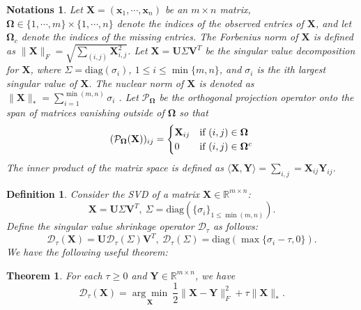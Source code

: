 \documentclass[fontset=windows]{article}
\newtheorem{definition}{Definition}[section]
\newtheorem{theorem}{Theorem}[section]
\newtheorem{notations}{Notations}
\begin{document}
{\begin{notations}
    Let $\mathbf X = (\mathbf x_1,\cdots,\mathbf x_n)$ be an $m \times n$ matrix, $\mathbf \Omega \in \{1,\cdots,m\}\times\{1,\cdots,n\}$ denote the indices of the observed
    entries of $\mathbf X$, and let $\mathbf \Omega_c$ denote the indices of the missing entries. The Forbenius norm of $\mathbf X$ is defined as $\lVert\mathbf X \rVert_F = \sqrt{\sum_{(i,j)} \mathbf X^2_{i,j}}$. Let $\mathbf X=\mathbf U\mathbf \varSigma \mathbf V^T$ be the singular value decomposition for $\mathbf X$, where $\varSigma = \text{diag}(\sigma_i)$, $1 \leq i\leq \min\{m,n\}$, and $\sigma_i$ is the ith largest singular value of $\mathbf X$. The nuclear norm of $\mathbf X$ is denoted as $\lVert\mathbf X \rVert_* = \sum_{i=1}^{\min(m,n)} \sigma_i$ . Let $\mathcal{P}_{\mathbf \Omega}$ be the orthogonal projection operator onto the span of matrices vanishing outside of $\mathbf \Omega$ so that
    \begin{equation*}
        (\mathcal{P}_{\mathbf \Omega}(\mathbf X))_{ij} = \begin{cases}
            \mathbf X_{ij} & \text{\rm if } (i,j) \in \mathbf \Omega\\
        0 & \text{\rm if } (i,j) \in \mathbf \Omega^c
    \end{cases}
    \end{equation*}
    The  inner product of the matrix space is defined as $ \langle \mathbf X,\mathbf Y\rangle = \sum_{i,j} = \mathbf X_{ij}\mathbf Y_{ij}$.
\end{notations}

\begin{definition}
    Consider the SVD of a matrix $\mathbf X \in \mathbb{R}^{m \times n}$:
    \begin{equation}
        \mathbf X = \mathbf U \mathbf \varSigma \mathbf V^T, \ \mathbf \varSigma = \text{diag}(\{\sigma_i\}_{1 \leq \min(m,n)}).
    \end{equation}
    Define the singular value shrinkage operator $\mathcal D_{\tau}$\cite{cai.shen200810} as follows:
    \begin{equation}
        \mathcal D_{\tau}(\mathbf X) = \mathbf U \mathcal D_{\tau}(\mathbf \varSigma) \mathbf V^T, \ \mathcal D_{\tau}(\mathbf \varSigma) = \text{diag}(\max\{\sigma_i-\tau,0\}).
    \end{equation}
    We have the following useful theorem:	
\end{definition}

\begin{theorem}
    For each $\tau \geq 0$ and $\mathbf Y \in \mathbb{R}^{m \times n}$, we have
    \begin{equation}
        \mathcal D_{\tau}(\mathbf X) = \underset{\mathbf X}{\arg\min}\  \frac{1}{2} \lVert \mathbf X-\mathbf Y\rVert_F^2 + \tau \lVert\mathbf X \lVert_*.
    \end{equation} 
    \label{thm32}
\end{theorem}

}
\end{document}

